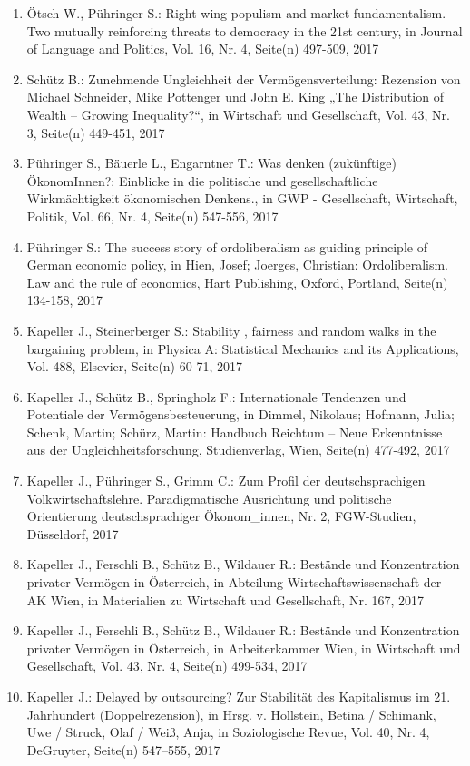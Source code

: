 \begin{enumerate}
    	 \item Ötsch W., Pühringer S.: Right-wing populism and market-fundamentalism. Two mutually reinforcing threats to democracy in the 21st century, in Journal of Language and Politics, Vol. 16, Nr. 4, Seite(n) 497-509, 2017
	 \item Schütz B.: Zunehmende Ungleichheit der Vermögensverteilung: Rezension von Michael Schneider, Mike Pottenger und John E. King „The Distribution of Wealth – Growing Inequality?“, in Wirtschaft und Gesellschaft, Vol. 43, Nr. 3, Seite(n) 449-451, 2017
	 \item Pühringer S., Bäuerle L., Engarntner T.: Was denken (zukünftige) ÖkonomInnen?: Einblicke in die politische und gesellschaftliche Wirkmächtigkeit ökonomischen Denkens., in GWP - Gesellschaft, Wirtschaft, Politik, Vol. 66, Nr. 4, Seite(n) 547-556, 2017
	 \item Pühringer S.: The success story of ordoliberalism as guiding principle of German economic policy, in Hien, Josef; Joerges, Christian: Ordoliberalism. Law and the rule of economics, Hart Publishing, Oxford, Portland, Seite(n) 134-158, 2017
	 \item Kapeller J., Steinerberger S.: Stability , fairness and random walks in the bargaining problem, in Physica A: Statistical Mechanics and its Applications, Vol. 488, Elsevier, Seite(n) 60-71, 2017
	 \item Kapeller J., Schütz B., Springholz F.: Internationale Tendenzen und Potentiale der Vermögensbesteuerung, in Dimmel, Nikolaus; Hofmann, Julia; Schenk, Martin; Schürz, Martin: Handbuch Reichtum – Neue Erkenntnisse aus der Ungleichheitsforschung, Studienverlag, Wien, Seite(n) 477-492, 2017
	 \item Kapeller J., Pühringer S., Grimm C.: Zum Profil der deutschsprachigen Volkwirtschaftslehre. Paradigmatische Ausrichtung und politische Orientierung deutschsprachiger Ökonom_innen, Nr. 2, FGW-Studien, Düsseldorf, 2017
	 \item Kapeller J., Ferschli B., Schütz B., Wildauer R.: Bestände und Konzentration privater Vermögen in Österreich, in Abteilung Wirtschaftswissenschaft der AK Wien, in Materialien zu Wirtschaft und Gesellschaft, Nr. 167, 2017
	 \item Kapeller J., Ferschli B., Schütz B., Wildauer R.: Bestände und Konzentration privater Vermögen in Österreich, in Arbeiterkammer Wien, in Wirtschaft und Gesellschaft, Vol. 43, Nr. 4, Seite(n) 499-534, 2017
	 \item Kapeller J.: Delayed by outsourcing? Zur Stabilität des Kapitalismus im 21. Jahrhundert (Doppelrezension), in Hrsg. v. Hollstein, Betina / Schimank, Uwe / Struck, Olaf / Weiß, Anja, in Soziologische Revue, Vol. 40, Nr. 4, DeGruyter, Seite(n) 547–555, 2017

\end{enumerate}
